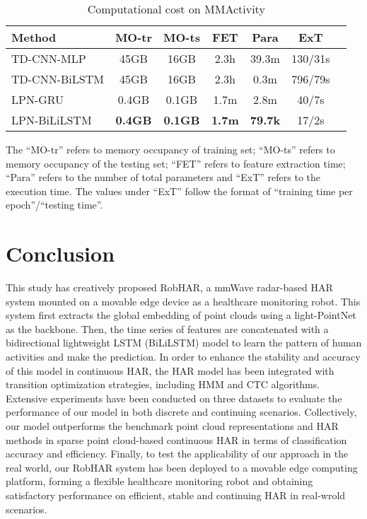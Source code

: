 \begin{table}[h]
\centering
\caption{Computational cost on MMActivity}
\begin{threeparttable}
\label{table:Compu_cost_MMAct}
{\begin{tabular}[l]{@{}lcccccc}
\toprule
  Method &MO-tr&MO-ts&FET&Para&ExT\\
\midrule
  TD-CNN-MLP\cite{singh2019radhar}&45GB&16GB&2.3h&39.3m&130/31s\\
  TD-CNN-BiLSTM\cite{singh2019radhar}&45GB&16GB&2.3h&0.3m&796/79s\\
\midrule
  LPN-GRU&0.4GB&0.1GB&1.7m&2.8m&40/7s\\
  LPN-BiLiLSTM&\textbf{0.4GB}&\textbf{0.1GB}&\textbf{1.7m}&\textbf{79.7k}&17/2s\\
\bottomrule
\end{tabular}}
\begin{tablenotes}
\small
\item The ``MO-tr'' refers to memory occupancy of training set; ``MO-ts'' refers to memory occupancy of the testing set; ``FET'' refers to feature extraction time; ``Para'' refers to the number of total parameters and ``ExT'' refers to the execution time. The values under ``ExT'' follow the format of ``training time per epoch''/``testing time''.
\end{tablenotes}
\end{threeparttable}
\end{table}


\section{Conclusion}
\label{sec: conclusion}
This study has creatively proposed RobHAR, a mmWave radar-based HAR system mounted on a movable edge device as a healthcare monitoring robot. This system first extracts the global embedding of point clouds using a light-PointNet as the backbone. Then, the time series of features are concatenated with a bidirectional lightweight LSTM (BiLiLSTM) model to learn the pattern of human activities and make the prediction. 
In order to enhance the stability and accuracy of this model in continuous HAR, the HAR model has been integrated with transition optimization strategies, including HMM and CTC algorithms. Extensive experiments have been conducted on three datasets to evaluate the performance of our model in both discrete and continuing scenarios. Collectively, our model outperforms the benchmark point cloud representations and HAR methods in sparse point cloud-based continuous HAR in terms of classification accuracy and efficiency. Finally, to test the applicability of our approach in the real world, our RobHAR system has been deployed to a movable edge computing platform, forming a flexible healthcare monitoring robot and obtaining satisfactory performance on efficient, stable and continuing HAR in real-wrold scenarios.




